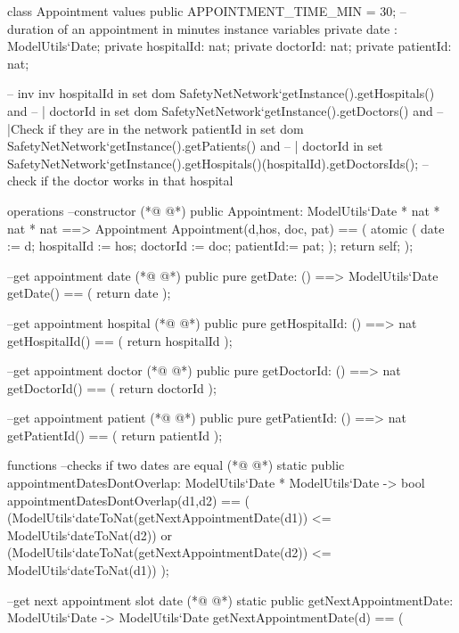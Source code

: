\begin{vdmpp}[breaklines=true]
class Appointment
values 
 public APPOINTMENT_TIME_MIN = 30; -- duration of an appointment in minutes
instance variables
 private date : ModelUtils`Date;
  private hospitalId: nat;
  private doctorId: nat;
  private patientId: nat;
  
  -- inv 
 inv hospitalId in set dom SafetyNetNetwork`getInstance().getHospitals() and   -- |
    doctorId in set dom SafetyNetNetwork`getInstance().getDoctors() and       -- |Check if they are in the network
    patientId in set dom SafetyNetNetwork`getInstance().getPatients() and     -- |
    doctorId in set SafetyNetNetwork`getInstance().getHospitals()(hospitalId).getDoctorsIds(); --check if the doctor works in that hospital
    
operations
 --constructor
(*@
\label{Appointment:18}
@*)
 public Appointment: ModelUtils`Date * nat * nat * nat ==> Appointment
 Appointment(d,hos, doc, pat) == (
  atomic (
   date := d;
   hospitalId := hos;
   doctorId := doc;
   patientId:= pat;
  );
  return self;
 );

  --get appointment date
(*@
\label{getDate:30}
@*)
  public pure getDate: () ==> ModelUtils`Date
  getDate() == (
   return date
  );
    
  --get appointment hospital
(*@
\label{getHospitalId:36}
@*)
  public pure getHospitalId: () ==> nat
  getHospitalId() == (
   return hospitalId
  );
  
  --get appointment doctor
(*@
\label{getDoctorId:42}
@*)
  public pure getDoctorId: () ==> nat
  getDoctorId() == (
   return doctorId
  );
 
  --get appointment patient
(*@
\label{getPatientId:48}
@*)
  public pure getPatientId: () ==> nat
  getPatientId() == (
   return patientId
  );
  
functions
 --checks if two dates are equal
(*@
\label{appointmentDatesDontOverlap:55}
@*)
 static public appointmentDatesDontOverlap: ModelUtils`Date * ModelUtils`Date -> bool
 appointmentDatesDontOverlap(d1,d2) == (
  (ModelUtils`dateToNat(getNextAppointmentDate(d1)) <= ModelUtils`dateToNat(d2)) or
  (ModelUtils`dateToNat(getNextAppointmentDate(d2)) <= ModelUtils`dateToNat(d1)) 
 );
 
 --get next appointment slot date
(*@
\label{getNextAppointmentDate:62}
@*)
 static public getNextAppointmentDate: ModelUtils`Date -> ModelUtils`Date
 getNextAppointmentDate(d) == (


\end{vdmpp}
